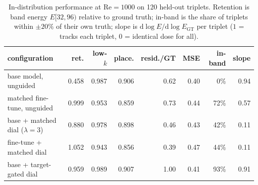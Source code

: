 \begin{table}[t]
  \centering
  \caption{In-distribution performance at $\mathrm{Re}=1000$ on 120 held-out triplets. Retention is band energy $E[32,96)$ relative to ground truth; in-band is the share of triplets within $\pm20\%$ of their own truth; slope is $\mathrm{d}\log E/\mathrm{d}\log E_{\mathrm{GT}}$ per triplet ($1$ = tracks each triplet, $0$ = identical dose for all).}
  \label{tab:re1000-headline}
  \begin{tabular}{lrrrrrrr}
    \toprule
    configuration & ret. & low-$k$ & place. & resid./GT & MSE & in-band & slope \\
    \midrule
    base model, unguided & 0.458 & 0.987 & 0.906 & 0.62 & 0.40 & 0\% & 0.94 \\
    matched fine-tune, unguided & 0.999 & 0.953 & 0.859 & 0.73 & 0.44 & 72\% & 0.57 \\
    base + matched dial ($\lambda=3$) & 0.880 & 0.978 & 0.898 & 0.46 & 0.43 & 42\% & 0.11 \\
    fine-tune + matched dial & 1.052 & 0.943 & 0.856 & 0.39 & 0.47 & 44\% & 0.11 \\
    base + target-gated dial & 0.959 & 0.989 & 0.907 & 1.00 & 0.41 & 93\% & 0.91 \\
    \bottomrule
  \end{tabular}
\end{table}
